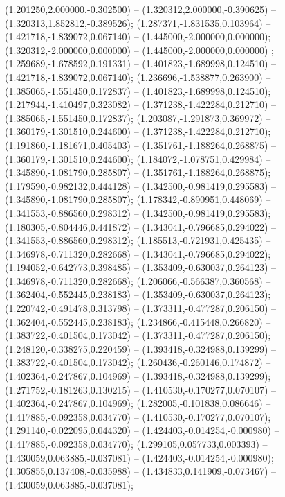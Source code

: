  (1.201250,2.000000,-0.302500) -- (1.320312,2.000000,-0.390625) -- (1.320313,1.852812,-0.389526);
 (1.287371,-1.831535,0.103964) -- (1.421718,-1.839072,0.067140) -- (1.445000,-2.000000,0.000000);
 (1.320312,-2.000000,0.000000) -- (1.445000,-2.000000,0.000000) ;
 (1.259689,-1.678592,0.191331) -- (1.401823,-1.689998,0.124510) -- (1.421718,-1.839072,0.067140);
 (1.236696,-1.538877,0.263900) -- (1.385065,-1.551450,0.172837) -- (1.401823,-1.689998,0.124510);
 (1.217944,-1.410497,0.323082) -- (1.371238,-1.422284,0.212710) -- (1.385065,-1.551450,0.172837);
 (1.203087,-1.291873,0.369972) -- (1.360179,-1.301510,0.244600) -- (1.371238,-1.422284,0.212710);
 (1.191860,-1.181671,0.405403) -- (1.351761,-1.188264,0.268875) -- (1.360179,-1.301510,0.244600);
 (1.184072,-1.078751,0.429984) -- (1.345890,-1.081790,0.285807) -- (1.351761,-1.188264,0.268875);
 (1.179590,-0.982132,0.444128) -- (1.342500,-0.981419,0.295583) -- (1.345890,-1.081790,0.285807);
 (1.178342,-0.890951,0.448069) -- (1.341553,-0.886560,0.298312) -- (1.342500,-0.981419,0.295583);
 (1.180305,-0.804446,0.441872) -- (1.343041,-0.796685,0.294022) -- (1.341553,-0.886560,0.298312);
 (1.185513,-0.721931,0.425435) -- (1.346978,-0.711320,0.282668) -- (1.343041,-0.796685,0.294022);
 (1.194052,-0.642773,0.398485) -- (1.353409,-0.630037,0.264123) -- (1.346978,-0.711320,0.282668);
 (1.206066,-0.566387,0.360568) -- (1.362404,-0.552445,0.238183) -- (1.353409,-0.630037,0.264123);
 (1.220742,-0.491478,0.313798) -- (1.373311,-0.477287,0.206150) -- (1.362404,-0.552445,0.238183);
 (1.234866,-0.415448,0.266820) -- (1.383722,-0.401504,0.173042) -- (1.373311,-0.477287,0.206150);
 (1.248120,-0.338275,0.220459) -- (1.393418,-0.324988,0.139299) -- (1.383722,-0.401504,0.173042);
 (1.260436,-0.260146,0.174872) -- (1.402364,-0.247867,0.104969) -- (1.393418,-0.324988,0.139299);
 (1.271752,-0.181263,0.130215) -- (1.410530,-0.170277,0.070107) -- (1.402364,-0.247867,0.104969);
 (1.282005,-0.101838,0.086646) -- (1.417885,-0.092358,0.034770) -- (1.410530,-0.170277,0.070107);
 (1.291140,-0.022095,0.044320) -- (1.424403,-0.014254,-0.000980) -- (1.417885,-0.092358,0.034770);
 (1.299105,0.057733,0.003393) -- (1.430059,0.063885,-0.037081) -- (1.424403,-0.014254,-0.000980);
 (1.305855,0.137408,-0.035988) -- (1.434833,0.141909,-0.073467) -- (1.430059,0.063885,-0.037081);
